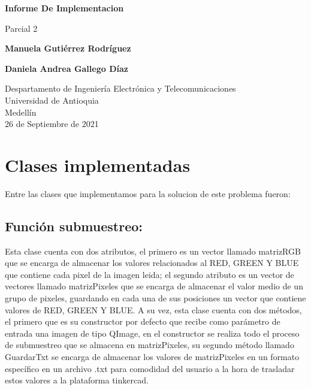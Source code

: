 \documentclass{article}
\begin{document}
\begin{titlepage}
    \begin{center}
        \vspace*{1cm}
            
        \Huge
        \textbf{Informe De Implementacion}
            
        \vspace{0.5cm}
        \LARGE
        Parcial 2
            
        \vspace{1.5cm}
            
        \textbf{Manuela Gutiérrez Rodríguez}
        \vspace{0.5cm}
        
        \textbf{Daniela Andrea Gallego Díaz}
            
        \vfill
            
        \vspace{0.8cm}
            
        \Large
        Despartamento de Ingeniería Electrónica y Telecomunicaciones\\
        Universidad de Antioquia\\
        Medellín\\
        26 de Septiembre de 2021
            
    \end{center}
\end{titlepage}

\tableofcontents
\newpage
\section{Clases implementadas}

Entre las clases que implementamos para la solucion de este problema fueron:

\subsection{Función submuestreo: }
Esta clase cuenta con dos atributos, el primero es un vector llamado matrizRGB que se encarga de almacenar los valores relacionados al RED, GREEN Y BLUE  que contiene cada pixel de la imagen leida; el segundo atributo es un vector de vectores llamado matrizPixeles que se encarga de almacenar el valor medio de un grupo de pixeles, guardando en cada una de sus posiciones un vector que contiene valores de RED, GREEN Y BLUE. A su vez, esta clase cuenta con dos métodos, el primero que es su constructor por defecto que recibe como parámetro de entrada una imagen de tipo QImage, en el constructor se realiza todo el proceso de submuestreo que se almacena en matrizPixeles, su segundo método llamado GuardarTxt se encarga de almacenar los valores de matrizPixeles en un formato específico en un archivo .txt para comodidad del usuario a la hora de trasladar estos valores a la plataforma tinkercad.
\end{document}
